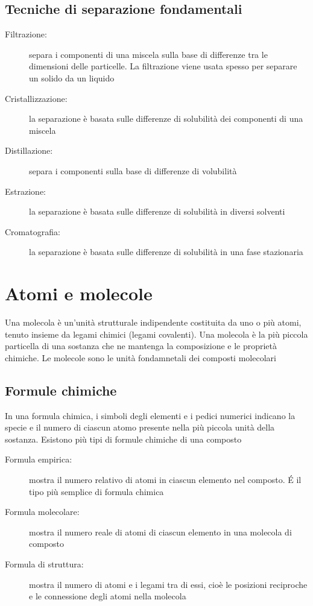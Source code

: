\documentclass[a4paper,11pt]{report}
\begin{document}
\subsection*{Tecniche di separazione fondamentali}

\begin{description}
	\item[Filtrazione:] separa i componenti di una miscela sulla base di differenze tra le dimensioni delle particelle. La filtrazione viene usata spesso per separare un solido da un liquido 
 \item[Cristallizzazione:] la separazione è basata sulle differenze di solubilità dei componenti di una miscela 
 \item[Distillazione:] separa i componenti sulla base di differenze di volubilità 
 \item[Estrazione:] la separazione è basata sulle differenze di solubilità in diversi solventi
 \item[Cromatografia:] la separazione è basata sulle differenze di solubilità in una fase stazionaria     
\end{description}

\section{Atomi e molecole}
Una molecola è un'unità strutturale indipendente costituita da uno o più atomi, tenuto insieme da legami chimici (legami covalenti). Una molecola è la più piccola particella di una sostanza che ne mantenga la composizione e le proprietà chimiche. Le molecole sono le unità fondamnetali dei composti molecolari

\subsection*{Formule chimiche}
In una formula chimica, i simboli degli elementi e i pedici numerici indicano la specie e il numero di ciascun atomo presente nella più piccola unità della sostanza. Esistono più tipi di formule chimiche di una composto

\begin{description}
	\item[Formula empirica:] mostra il numero relativo di atomi in ciascun elemento nel composto. \'E il tipo più semplice di formula chimica
 \item[Formula molecolare:] mostra il numero reale di atomi di ciascun elemento in una molecola di composto
 \item[Formula di struttura:] mostra il numero di atomi e i legami tra di essi, cioè le posizioni reciproche e le connessione degli atomi nella molecola    
\end{description}
\end{document}
